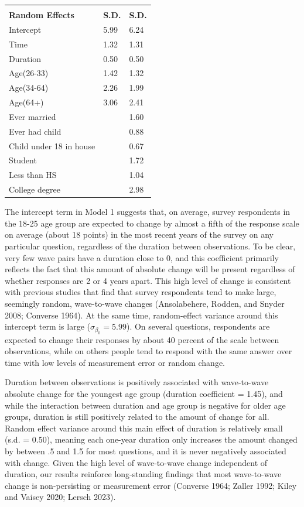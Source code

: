 \documentclass[
  12pt,
]{article}
\begin{document}
\begin{longtable}[]{@{}lll@{}}
& & \\
\textbf{Random Effects} & \textbf{S.D.} & \textbf{S.D.} \\
Intercept & 5.99 & 6.24 \\
Time & 1.32 & 1.31 \\
Duration & 0.50 & 0.50 \\
Age(26-33) & 1.42 & 1.32 \\
Age(34-64) & 2.26 & 1.99 \\
Age(64+) & 3.06 & 2.41 \\
Ever married & & 1.60 \\
Ever had child & & 0.88 \\
Child under 18 in house & & 0.67 \\
Student & & 1.72 \\
Less than HS & & 1.04 \\
College degree & & 2.98 \\
\end{longtable}

The intercept term in Model 1 suggests that, on average, survey respondents in the 18-25 age group are expected to change by almost a fifth of the response scale on average (about 18 points) in the most recent years of the survey on any particular question, regardless of the duration between observations. To be clear, very few wave pairs have a duration close to 0, and this coefficient primarily reflects the fact that this amount of absolute change will be present regardless of whether responses are 2 or 4 years apart. This high level of change is consistent with previous studies that find that survey respondents tend to make large, seemingly random, wave-to-wave changes (Ansolabehere, Rodden, and Snyder 2008; Converse 1964). At the same time, random-effect variance around this intercept term is large (\(\sigma_{\beta_0} = 5.99\)). On several questions, respondents are expected to change their responses by about 40 percent of the scale between observations, while on others people tend to respond with the same answer over time with low levels of measurement error or random change.

Duration between observations is positively associated with wave-to-wave absolute change for the youngest age group (duration coefficient = 1.45), and while the interaction between duration and age group is negative for older age groups, duration is still positively related to the amount of change for all. Random effect variance around this main effect of duration is relatively small (s.d. = 0.50), meaning each one-year duration only increases the amount changed by between .5 and 1.5 for most questions, and it is never negatively associated with change. Given the high level of wave-to-wave change independent of duration, our results reinforce long-standing findings that most wave-to-wave change is non-persisting or measurement error (Converse 1964; Zaller 1992; Kiley and Vaisey 2020; Lersch 2023).
\end{document}
